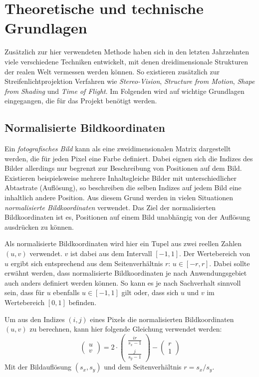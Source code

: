 \documentclass[ngerman,a4paper,parskip=half]{scrartcl}
\begin{document}

\section{Theoretische und technische Grundlagen}
\label{sec:basics}

Zusätzlich zur hier verwendeten Methode haben sich in den letzten Jahrzehnten viele verschiedene Techniken entwickelt, mit denen dreidimensionale Strukturen der realen Welt vermessen werden können. So existieren zusätzlich zur Streifenlichtprojektion Verfahren wie \emph{Stereo-Vision}, \emph{Structure from Motion}, \emph{Shape from Shading} und \emph{Time of Flight}. Im Folgenden wird auf wichtige Grundlagen eingegangen, die für das Projekt benötigt werden.

\subsection{Normalisierte Bildkoordinaten}
\label{sec:imagecoordinates}

Ein \emph{fotografisches Bild} kann als eine zweidimensionalen Matrix dargestellt werden, die für jeden Pixel eine Farbe definiert. Dabei eignen sich die Indizes des Bilder allerdings nur begrenzt zur Beschreibung von Positionen auf dem Bild. Existieren beispielsweise mehrere Inhaltsgleiche Bilder mit unterschiedlicher Abtastrate (Auflösung), so beschreiben die selben Indizes auf jedem Bild eine inhaltlich andere Position. Aus diesem Grund werden in vielen Situationen \emph{normalisierte Bildkoordinaten} verwendet. Das Ziel der normalisierten Bildkoordinaten ist es, Positionen auf einem Bild unabhängig von der Auflösung ausdrücken zu können.

Als normalisierte Bildkoordinaten wird hier ein Tupel aus zwei reellen Zahlen $(u,v)$ verwendet. $v$ ist dabei aus dem Intervall $[-1,1]$. Der Wertebereich von $u$ ergibt sich entsprechend aus dem Seitenverhältnis $r$: $u \in [-r,r]$. Dabei sollte erwähnt werden, dass normalisierte Bildkoordinaten je nach Anwendungsgebiet auch anders definiert werden können. So kann es je nach Sachverhalt sinnvoll sein, dass für $u$ ebenfalls $u \in [-1,1]$ gilt oder, dass sich $u$ und $v$ im Wertebereich $[0,1]$ befinden.

Um aus den Indizes $(i,j)$ eines Pixels die normalisierten Bildkoordinaten $(u,v)$ zu berechnen, kann hier folgende Gleichung verwendet werden:
\[ \begin{pmatrix}
u \\ v
\end{pmatrix} = 2 \cdot \begin{pmatrix}
\frac{i r}{s_x - 1} \\
\frac{j}{s_y - 1}
\end{pmatrix} - \begin{pmatrix}
r \\ 1
\end{pmatrix} \]
Mit der Bildauflösung $(s_x, s_y)$ und dem Seitenverhältnis $r = s_x/s_y$.
\end{document}
